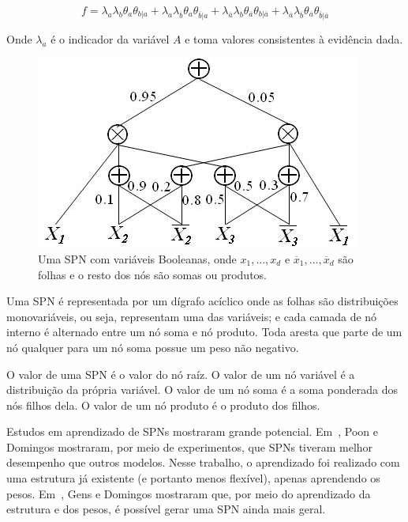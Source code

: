 \documentclass[a4paper,10pt]{article}
\theoremstyle{plain}
\begin{document}
\begin{equation*}
  f = \lambda_a\lambda_b\theta_a\theta_{b|a} +
  \lambda_a\lambda_{\overline{b}}\theta_a\theta_{\overline{b}|a} +
  \lambda_{\overline{a}}\lambda_b\theta_{\overline{a}}\theta_{b|\overline{a}} +
  \lambda_{\overline{a}}\lambda_{\overline{b}}\theta_{\overline{a}}\theta_{\overline{b}|\overline{a}}
\end{equation*}

Onde $\lambda_{a}$ é o indicador da variável $A$ e toma valores consistentes à evidência dada.

\begin{figure}[h]
  \centering\includegraphics[scale=0.7]{imgs/domingos_poon.jpg}
  \caption{Uma SPN com variáveis Booleanas, onde $x_1,\ldots,x_d$ e $\overline{x}_1,\ldots,
    \overline{x}_d$ são folhas e o resto dos nós são somas ou produtos.\cite{poon-domingos}}
\end{figure}

Uma SPN é representada por um dígrafo acíclico onde as folhas são distribuições monovariáveis, ou
seja, representam uma das variáveis; e cada camada de nó interno é alternado entre um nó soma e nó
produto. Toda aresta que parte de um nó qualquer para um nó soma possue um peso não negativo.

O valor de uma SPN é o valor do nó raíz. O valor de um nó variável é a distribuição da própria
variável. O valor de um nó soma é a soma ponderada dos nós filhos dela. O valor de um nó produto
é o produto dos filhos.

Estudos em aprendizado de SPNs mostraram grande potencial. Em~\cite{poon-domingos}, Poon e Domingos
mostraram, por meio de experimentos, que SPNs tiveram melhor desempenho que outros modelos. Nesse
trabalho, o aprendizado foi realizado com uma estrutura já existente (e portanto menos flexível),
apenas aprendendo os pesos. Em~\cite{gens-domingos}, Gens e Domingos mostraram que, por meio do
aprendizado da estrutura e dos pesos, é possível gerar uma SPN ainda mais geral.
\end{document}
